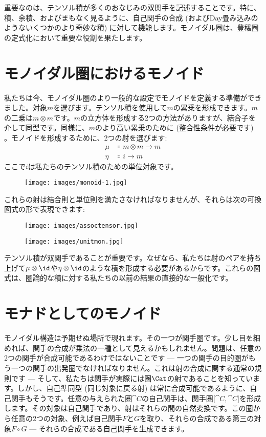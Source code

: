 重要なのは、テンソル積が多くのおなじみの双関手を記述することです。特に、積、余積、およびまもなく見るように、自己関手の合成 (およびDay畳み込みのようないくつかのより奇妙な積) に対して機能します。モノイダル圏は、豊穣圏の定式化において重要な役割を果たします。

\section{モノイダル圏におけるモノイド}

私たちは今、モノイダル圏のより一般的な設定でモノイドを定義する準備ができました。対象$m$を選びます。テンソル積を使用して$m$の累乗を形成できます。$m$の二乗は$m \otimes m$です。$m$の立方体を形成する2つの方法がありますが、結合子を介して同型です。同様に、$m$のより高い累乗のために (整合性条件が必要です) 。モノイドを形成するために、2つの射を選びます: 
\begin{align*}
  \mu  & \Colon m \otimes m \to m \\
  \eta & \Colon i \to m
\end{align*}
ここで$i$は私たちのテンソル積のための単位対象です。

\begin{figure}[H]
  \centering
  \texttt{[image: images/monoid-1.jpg]}
\end{figure}

\noindent
これらの射は結合則と単位則を満たさなければなりませんが、それらは次の可換図式の形で表現できます: 

\begin{figure}[H]
  \centering
  \texttt{[image: images/assoctensor.jpg]}
\end{figure}

\begin{figure}[H]
  \centering
  \texttt{[image: images/unitmon.jpg]}
\end{figure}

\noindent
テンソル積が双関手であることが重要です。なぜなら、私たちは射のペアを持ち上げて$\mu \otimes \id$や$\eta \otimes \id$のような積を形成する必要があるからです。これらの図式は、圏論的な積に対する私たちの以前の結果の直接的な一般化です。

\section{モナドとしてのモノイド}

モノイダル構造は予期せぬ場所で現れます。その一つが関手圏です。少し目を細めれば、関手の合成が乗法の一種として見えるかもしれません。問題は、任意の2つの関手が合成可能であるわけではないことです --- 一つの関手の目的圏がもう一つの関手の出発圏でなければなりません。これは射の合成に関する通常の規則です --- そして、私たちは関手が実際には圏$\Cat$の射であることを知っています。しかし、自己準同型 (同じ対象に戻る射) は常に合成可能であるように、自己関手もそうです。任意の与えられた圏$\cat{C}$の自己関手は、関手圏${[}\cat{C}, \cat{C}{]}$を形成します。その対象は自己関手であり、射はそれらの間の自然変換です。この圏から任意の2つの対象、例えば自己関手$F$と$G$を取り、それらの合成である第三の対象$F \circ G$ --- それらの合成である自己関手を生成できます。


